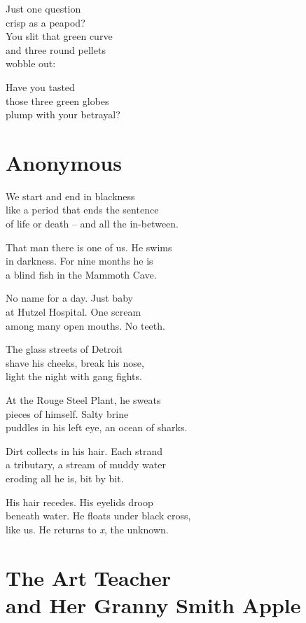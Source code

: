 \documentclass[twoside,10pt]{book}
\begin{document}
Just one question\\
crisp as a peapod?\\
You slit that green curve\\
and three round pellets\\
wobble out:

Have you tasted\\
those three green globes\\
plump with your betrayal?

\clearpage
\section{Anonymous}

We start and end in blackness\\
like a period that ends the sentence\\
of life or death -- and all the in-between.

That man there is one of us. He swims\\
in darkness. For nine months he is\\
a blind fish in the Mammoth Cave.

No name for a day. Just baby\\
at Hutzel Hospital. One scream\\
among many open mouths. No teeth.

The glass streets of Detroit\\
shave his cheeks, break his nose,\\
light the night with gang fights.

At the Rouge Steel Plant, he sweats\\
pieces of himself. Salty brine\\
puddles in his left eye, an ocean of sharks.

Dirt collects in his hair. Each strand\\
a tributary, a stream of muddy water\\
eroding all he is, bit by bit.

His hair recedes. His eyelids droop\\
beneath water. He floats under black cross,\\
like us. He returns to \emph{x}, the unknown.

\clearpage
\section{The Art Teacher\\ and Her Granny Smith Apple}
\end{document}
